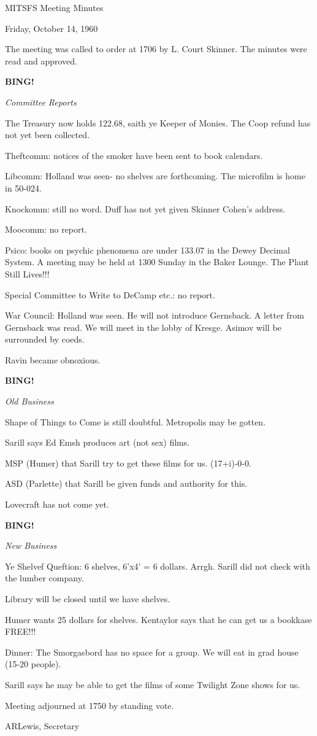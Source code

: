 \documentclass[12pt]{article}
\newcommand{\bing}{{\bf BING!} }
\newcommand{\goto}[1]{\bing \vskip 12pt \centerline{{\em{#1}}}}
\begin{document}
\begin{center}

MITSFS Meeting Minutes

Friday, October 14, 1960

\end{center}
 
\vspace{12pt}

\setlength{\parskip}{6pt}

\noindent
The meeting was called to order at 1706 by L. Court Skinner. The minutes were read and approved.

\goto{Committee Reports}

The Treasury now holds 122.68, saith ye Keeper of Monies. The Coop refund has not yet been collected.

Theftcomm: notices of the smoker have been sent to book calendars.

Libcomm: Holland was seen- no shelves are forthcoming. The microfilm is home in 50-024.

Knockomm: still no word. Duff has not yet given Skinner Cohen's address.

Moocomm: no report.

Psico: books on psychic phenomena are under 133.07 in the Dewey Decimal System. A meeting may be held at 1300 Sunday in the Baker Lounge. The Plant Still Lives!!!

Special Committee to Write to DeCamp etc.: no report.

War Council: Holland was seen. He will not introduce Gernsback. A letter from Gernsback was read. We will meet in the lobby of Kresge. Asimov will be surrounded by coeds.

Ravin became obnoxious.

\goto{Old Business}

Shape of Things to Come is still doubtful. Metropolis may be gotten.

Sarill says Ed Emsh produces art (not sex) films.

MSP (Humer) that Sarill try to get these films for us. (17+i)-0-0.

ASD (Parlette) that Sarill be given funds and authority for this.

Lovecraft has not come yet.

\goto{New Business}

Ye Shelvef Queftion: 6 shelves, 6'x4' = 6 dollars. Arrgh. Sarill did not check with the lumber company.

Library will be closed until we have shelves.

Humer wants 25 dollars for shelves. Kentaylor says that he can get us a bookkase FREE!!!

Dinner: The Smorgasbord has no space for a group. We will eat in grad house (15-20 people).

Sarill says he may be able to get the films of some Twilight Zone shows for us.

Meeting adjourned at 1750 by standing vote.

\vspace{12pt}

\centerline{ARLewis, Secretary}
\end{document}
